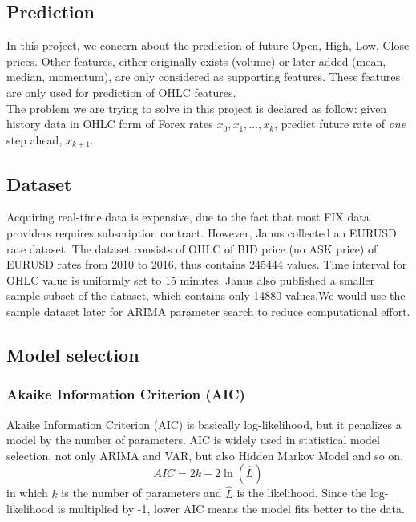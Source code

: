 \documentclass[11pt]{article}
\begin{document}
\begin{figure}
  
\end{figure}

\subsection{Prediction}
In this project, we concern about the prediction of future Open, High, Low,
Close prices. Other features, either originally exists (volume) or later added
(mean, median, momentum), are only considered as supporting features. These
features are only used for prediction of OHLC features.\\
The problem we are trying to solve in this project is declared as follow: given
history data in OHLC form of Forex rates $x_0, x_1,\ldots,x_k$, predict future
rate of \textit{one} step ahead, $x_{k+1}$.

\subsection{Dataset}
Acquiring real-time data is expensive, due to the fact that most FIX data
providers requires subscription contract. However, Janus \cite{meehau16eurusd}
collected an EURUSD rate dataset. The dataset consists of OHLC of BID price (no
ASK price) of EURUSD rates from 2010 to 2016, thus contains 245444 values. Time
interval for OHLC value is uniformly set to 15 minutes. Janus also published a
smaller sample subset of the dataset, which contains only 14880 values.We would
use the sample dataset later for ARIMA parameter search to reduce computational
effort.

\subsection{Model selection}
\subsubsection{Akaike Information Criterion (AIC)}
Akaike Information Criterion (AIC) is basically log-likelihood, but it penalizes
a model by the number of parameters. AIC is widely used in statistical model
selection, not only ARIMA and VAR, but also Hidden Markov Model and so on.
$$
AIC = 2k -2\ln(\hat{L})
$$
in which $k$ is the number of parameters and $\hat{L}$ is the likelihood. Since
the log-likelihood is multiplied by -1, lower AIC means the model fits better to
the data.
\end{document}
